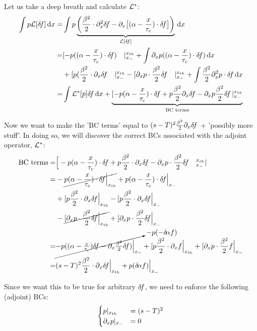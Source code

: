 \documentclass{article}
\begin{document}
Let us take a deep breath and calculate ${ { \mathcal{L} }^* }$:
\begin{align*}
\int p \L [\df] \intd{x} =&
\int p \underbrace{\left(\frac{\b^2 }{2}\cdot \di^2_x \df -  
			 \di_x \big[ (\a- \frac{x}{\tc})\cdot \df \big]\right)}_{\L [\df]} \intd{x}
\\
=& [ -p ((\a- \frac{x}{\tc})  \cdot \df)\quad  \vert^\xth_\xmin
+ \int \di_xp ((\a- \frac{x}{\tc})  \cdot \df) \intd{x}
\\
& + [p (\frac{\b^2 }{2}\cdot \di_x \df \quad \vert ^\xth_\xmin
- [ \di_x p \cdot \frac{\b^2 }{2}  \df\quad \vert^\xth_\xmin 
+ \int \frac{\b^2 }{2} \di^2_xp    \cdot \df \intd{x} 
\\
=& \int \Lstar [p] \df \intd{x} 
+\underbrace{[-p(\a- \frac x \tc) \cdot \df 
+ p \frac{\b^2}{2} \di_x \df 
-\di_x p \frac{\b^2}{2} \df \,\vert^\xth_\xmin }_{\text{BC terms}}
\end{align*}

Now we want to make the 'BC terms' equal to $(s-T)^2 \frac{{\beta}^2}{2} {\partial}_x { \delta\! f}$
+ 'possibly more stuff'.
In doing so, we will discover the correct BCs associated with the adjoint
operator, ${ { \mathcal{L} }^* }$:
\begin{align*}
\textrm{BC terms} =& 
\Big[ -p (\a- \frac{x}{\tc})  \cdot \df 
+ p \frac{\b^2 }{2}\cdot \di_x \df   
- \di_x p \cdot \frac{\b^2 }{2}  \df   \quad ^\xth_\xmin\vert 
\\
=& -\cancel{p (\a- \frac{x}{\tc})  \cdot \df \Big|_\xth}
 + p (\a- \frac{x}{\tc}) \cdot \df \Big|_\xmin
\\ 
& + [p \frac{\b^2 }{2}\cdot \di_x \df \Big|_\xth
 - [p \frac{\b^2 }{2}\cdot \di_x \df \Big|_\xmin
\\
&- \cancel{[ \di_x p \cdot \frac{\b^2 }{2}   \df\Big|_\xth}
 + [ \di_x p \cdot \frac{\b^2 }{2}   \df\Big|_\xmin
\\
=& \cancelto{-p (-\da f)}{-p ((\a- \tfrac x \tc)\df - \di_x \tfrac {\b^2}2
\df) \Big|_\xmin} 
+ [p \frac{\b^2 }{2}\cdot \di_x f \Big|_\xth
+ [ \di_x p \cdot \frac{\b^2 }{2}   f\Big|_\xmin
\\
=& (s-T)^2 \frac{\b^2 }{2}\cdot \di_x \df\Big|_\xth 
+  p (\da f)\Big|_\xmin
\end{align*}

Since we want this to be true for arbitrary ${ \delta\! f}$, we need to enforce the
following (adjoint) BCs: 
$$
\begin{cases}
p |_{ x_{th} } &= (s-T)^2
\\
{\partial}_xp |_{ x_{-} } &= 0
\end{cases}
$$
\end{document}
